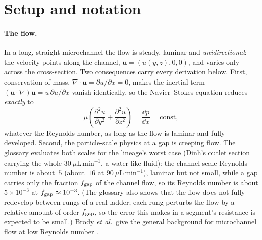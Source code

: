 \section{Setup and notation}
\label{sec:setup}

\paragraph{The flow.} In a long, straight microchannel the flow is steady, laminar and
\emph{unidirectional}: the velocity points along the channel,
$\mathbf{u}=(u(y,z),0,0)$, and varies only across the cross-section. Two consequences carry
every derivation below. First, conservation of mass,
$\nabla\cdot\mathbf{u}=\partial u/\partial x=0$, makes the inertial term
$(\mathbf{u}\cdot\nabla)\mathbf{u}=u\,\partial u/\partial x$ vanish identically, so the
Navier--Stokes equation reduces \emph{exactly} to
\begin{equation}
\mu\left(\frac{\partial^2 u}{\partial y^2}+\frac{\partial^2 u}{\partial z^2}\right)=\frac{\dd p}{\dd x}=\text{const},
\label{eq:stokes}
\end{equation}
whatever the Reynolds number, as long as the flow is laminar and fully developed. Second,
the particle-scale physics at a gap is creeping flow. The glossary evaluates both scales
for the lineage's worst case (Dinh's outlet section carrying the whole
$30~\mu\mathrm{L\,min^{-1}}$, a water-like fluid): the channel-scale Reynolds number is
about~$5$ (about~$16$ at $90~\mu\mathrm{L\,min^{-1}}$), laminar but not small, while a gap
carries only the fraction $f_{\mathrm{gap}}$ of the channel flow, so its Reynolds number is about
$5\times10^{-3}$ at $f_{\mathrm{gap}}\approx10^{-3}$. (The glossary also shows that the flow does not
fully redevelop between rungs of a real ladder; each rung perturbs the flow by a relative
amount of order $f_{\mathrm{gap}}$, so the error this makes in a segment's resistance is expected to be
small.) Brody \emph{et al.}\ give the general background
for microchannel flow at low Reynolds number \cite{bbrody}.

